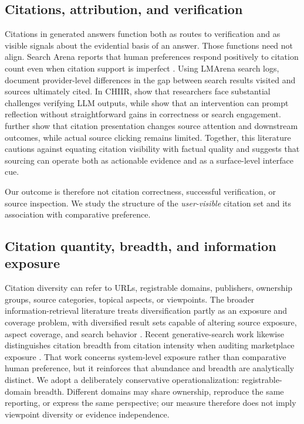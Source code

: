\documentclass[sigconf,natbib=true,anonymous=true]{acmart}
\begin{document}
\subsection{Citations, attribution, and verification}
Citations in generated answers function both as routes to verification and as visible signals about the evidential basis of an answer. Those functions need not align. Search Arena reports that human preferences respond positively to citation count even when citation support is imperfect \citep{miroyan2026searcharena}. Using LMArena search logs, \citet{strauss2026attribution} document provider-level differences in the gap between search results visited and sources ultimately cited. In CHIIR, \citet{scozzi2026infallible} show that researchers face substantial challenges verifying LLM outputs, while \citet{bink2026canyoutellme} show that an intervention can prompt reflection without straightforward gains in correctness or search engagement. \citet{he2026transparency} further show that citation presentation changes source attention and downstream outcomes, while actual source clicking remains limited. Together, this literature cautions against equating citation visibility with factual quality and suggests that sourcing can operate both as actionable evidence and as a surface-level interface cue.

Our outcome is therefore not citation correctness, successful verification, or source inspection. We study the structure of the \emph{user-visible} citation set and its association with comparative preference.

\subsection{Citation quantity, breadth, and information exposure}
Citation diversity can refer to URLs, registrable domains, publishers, ownership groups, source categories, topical aspects, or viewpoints. The broader information-retrieval literature treats diversification partly as an exposure and coverage problem, with diversified result sets capable of altering source exposure, aspect coverage, and search behavior \citep{nikolov2019exposure,maxwell2019diversification}. Recent generative-search work likewise distinguishes citation breadth from citation intensity when auditing marketplace exposure \citep{cheng2026citationgovernance}. That work concerns system-level exposure rather than comparative human preference, but it reinforces that abundance and breadth are analytically distinct. We adopt a deliberately conservative operationalization: registrable-domain breadth. Different domains may share ownership, reproduce the same reporting, or express the same perspective; our measure therefore does not imply viewpoint diversity or evidence independence.
\end{document}
